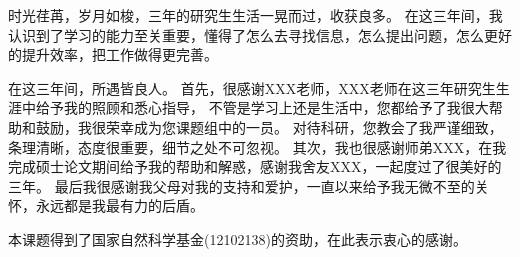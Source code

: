 \begin{acknowledgements}
时光荏苒，岁月如梭，三年的研究生生活一晃而过，收获良多。
在这三年间，我认识到了学习的能力至关重要，懂得了怎么去寻找信息，怎么提出问题，怎么更好的提升效率，把工作做得更完善。

在这三年间，所遇皆良人。
首先，很感谢XXX老师，XXX老师在这三年研究生生涯中给予我的照顾和悉心指导，
不管是学习上还是生活中，您都给予了我很大帮助和鼓励，我很荣幸成为您课题组中的一员。
对待科研，您教会了我严谨细致，条理清晰，态度很重要，细节之处不可忽视。
其次，我也很感谢师弟XXX，在我完成硕士论文期间给予我的帮助和解惑，感谢我舍友XXX，一起度过了很美好的三年。
最后我很感谢我父母对我的支持和爱护，一直以来给予我无微不至的关怀，永远都是我最有力的后盾。

本课题得到了国家自然科学基金(12102138)的资助，在此表示衷心的感谢。
\end{acknowledgements}

